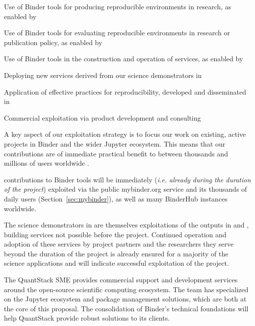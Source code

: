 \begin{compactenum}
  \item Use of Binder tools for producing reproducible environments in research, as enabled by 
  \item Use of Binder tools for evaluating reproducible environments in research or publication policy, as enabled by 
  \item Use of Binder tools in the construction and operation of services, as enabled by 
  \item Deploying new services derived from our science demonstrators in 
  \item Application of effective practices for reproducibility, developed and disseminated in 
  \item Commercial exploitation via product development and consulting 
\end{compactenum}

A key aspect of our exploitation strategy is to focus our work on existing,
active projects in Binder and the wider Jupyter ecosystem.
This means that our contributions are of immediate practical benefit to between
thousands and millions of users worldwide .

\TheProject contributions to Binder tools will be immediately (\emph{i.e.
  already during the duration of the project}) exploited via the public mybinder.org service
and its thousands of daily users (Section~\ref{sec:mybinder}), as well as many BinderHub instances worldwide.

The science demonstrators in  are themselves exploitations of the outputs
in  and ,
building services not possible before the project.
Continued operation and adoption of these services by project partners and the researchers they serve beyond
the duration of the project is already ensured for a majority of the science applications and will indicate
successful exploitation of the project.


The QuantStack SME provides commercial support and development services around the
open-source scientific computing ecosystem. The team has specialized on the Jupyter ecosystem
and package management solutions, which are both at the core of this proposal. The consolidation
of Binder's technical foundations will help QuantStack provide robust solutions to its clients.

